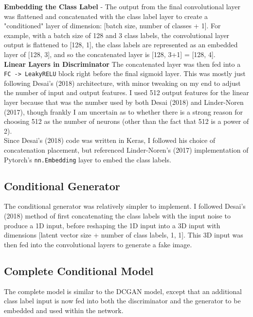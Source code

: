 \documentclass[11pt]{article}
\begin{document}
\textbf{Embedding the Class Label} - The output from the final
convolutional layer was flattened and concatenated with the class label
layer to create a "conditioned" layer of dimension: {[}batch size,
number of classes + 1{]}. For example, with a batch size of 128 and 3
class labels, the convolutional layer output is flattened to {[}128,
1{]}, the class labels are represented as an embedded layer of {[}128,
3{]}, and so the concatenated layer is {[}128, 3+1{]} = {[}128, 4{]}.\\

\textbf{Linear Layers in Discriminator} The concatenated layer was then
fed into a \texttt{FC\ -\textgreater{}\ LeakyRELU} block right before
the final sigmoid layer. This was mostly just following Desai's (2018)
architecture, with minor tweaking on my end to adjust the number of
input and output features. I used 512 output features for the linear
layer because that was the number used by both Desai (2018) and
Linder-Noren (2017), though frankly I am uncertain as to whether there
is a strong reason for choosing 512 as the number of neurons (other than
the fact that 512 is a power of 2).\\

Since Desai's (2018) code was written in Keras, I followed his choice of
concatenation placement, but referenced Linder-Noren's (2017)
implementation of Pytorch's \texttt{nn.Embedding} layer to embed the
class labels.

\subsection{Conditional Generator}\label{conditional-generator}

The conditional generator was relatively simpler to implement. I
followed Desai's (2018) method of first concatenating the class labels
with the input noise to produce a 1D input, before reshaping the 1D
input into a 3D input with dimensions {[}latent vector size + number of
class labels, 1, 1{]}. This 3D input was then fed into the convolutional
layers to generate a fake image.

\subsection{Complete Conditional
Model}\label{complete-conditional-model}

The complete model is similar to the DCGAN model, except that an
additional class label input is now fed into both the discriminator and
the generator to be embedded and used within the network.\\
\end{document}
